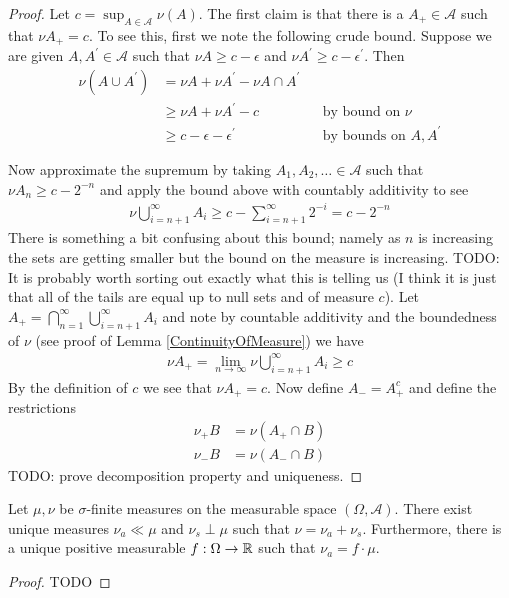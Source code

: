 \begin{proof}Let $c=\sup_{A \in \mathcal{A}} \nu(A)$.  The first claim
  is that there is a $A_+ \in \mathcal{A}$ such that $\nu A_+ = c$.
  To see this, first we note the following crude bound.  Suppose we
  are given $A,A^\prime \in \mathcal{A}$ such that $\nu A \geq c -
  \epsilon$ and $\nu A^\prime \geq c - \epsilon^\prime$.  Then 
\begin{align*}
\nu (A \cup A^\prime) &= \nu A + \nu A^\prime - \nu A \cap A^\prime \\
&\geq \nu A + \nu A^\prime - c & &\text{by bound on $\nu$} \\
&\geq c - \epsilon - \epsilon^\prime & &\text{by bounds on $A,A^\prime$}
\end{align*}

Now approximate the supremum by taking $A_1, A_2, \dots \in \mathcal{A}$ such that $\nu
  A_n \geq c - 2^{-n}$ and apply the bound above with countably
  additivity to see 
\begin{align*}
\nu \bigcup_{i=n+1}^\infty A_i \geq c - \sum_{i=n+1}^\infty 2^{-i} = c - 2^{-n}
\end{align*}
There is something a bit confusing about this bound; namely as $n$
is increasing the sets are getting smaller but the bound on the
measure is increasing.  TODO: It is probably worth sorting out exactly
what this is telling us (I think it is just that all of the tails are
equal up to null sets and of measure $c$).
Let $A_+ = \bigcap_{n=1}^\infty \bigcup_{i=n+1}^\infty A_i$ and note by
countable additivity and the boundedness of $\nu$ (see proof of Lemma
\ref{ContinuityOfMeasure}) we have 
\begin{align*} \nu A_+ = \lim_{n \to \infty} \nu
  \bigcup_{i=n+1}^\infty A_i \geq c
\end{align*}
By the definition of $c$ we see that $\nu A_+ = c$.  Now define $A_- =
A_+^c$ and define the restrictions 
\begin{align*}
\nu_+ B &= \nu (A_+ \cap B ) \\
\nu_- B &= \nu ( A_- \cap B )
\end{align*}
TODO: prove decomposition property and uniqueness.
\end{proof}

\begin{thm}\label{RadonNikodym}Let $\mu, \nu$
  be $\sigma$-finite measures on the measurable space $(\Omega,
  \mathcal{A})$.  There exist unique measures $\nu_a \ll \mu$ and
  $\nu_s \perp \mu$ such that $\nu = \nu_a + \nu_s$.  Furthermore,
  there is a unique positive measurable $f : \Omega \to \mathbb{R}$ such
  that $\nu_a = f \cdot \mu$.
\end{thm}
\begin{proof}TODO
\end{proof}

